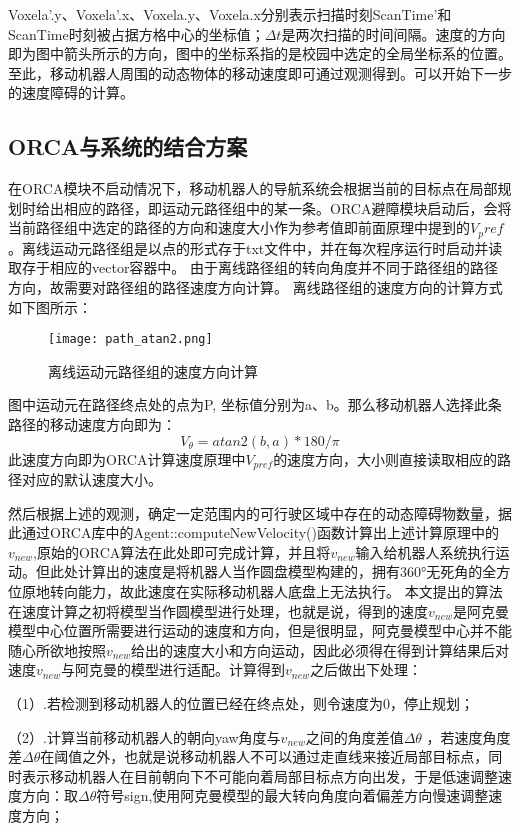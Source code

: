 Voxela'.y、Voxela'.x、Voxela.y、Voxela.x分别表示扫描时刻ScanTime'和ScanTime时刻被占据方格中心的坐标值；$\varDelta t$是两次扫描的时间间隔。速度的方向即为图中箭头所示的方向，图中的坐标系指的是校园中选定的全局坐标系的位置。
至此，移动机器人周围的动态物体的移动速度即可通过观测得到。可以开始下一步的速度障碍的计算。


\subsection{ORCA与系统的结合方案}
在ORCA模块不启动情况下，移动机器人的导航系统会根据当前的目标点在局部规划时给出相应的路径，即运动元路径组中的某一条。ORCA避障模块启动后，会将当前路径组中选定的路径的方向和速度大小作为参考值即前面原理中提到的$V_pref$。离线运动元路径组是以点的形式存于txt文件中，并在每次程序运行时启动并读取存于相应的vector容器中。
由于离线路径组的转向角度并不同于路径组的路径方向，故需要对路径组的路径速度方向计算。
离线路径组的速度方向的计算方式如下图所示：

\begin{figure}[ht]
    \centering
    \texttt{[image: path\_atan2.png]}
    \caption{离线运动元路径组的速度方向计算}
\end{figure}

图中运动元在路径终点处的点为P, 坐标值分别为a、b。那么移动机器人选择此条路径的移动速度方向即为：
\begin{equation}
    V_\theta = atan2(b ,a) * 180 / \pi 
\end{equation}
此速度方向即为ORCA计算速度原理中$V_{pref}$的速度方向，大小则直接读取相应的路径对应的默认速度大小。

然后根据上述的观测，确定一定范围内的可行驶区域中存在的动态障碍物数量，据此通过ORCA库中的Agent::computeNewVelocity()函数计算出上述计算原理中的$v_{new}$,原始的ORCA算法在此处即可完成计算，并且将$v_{new}$输入给机器人系统执行运动。但此处计算出的速度是将机器人当作圆盘模型构建的，拥有360°无死角的全方位原地转向能力，故此速度在实际移动机器人底盘上无法执行。
本文提出的算法在速度计算之初将模型当作圆模型进行处理，也就是说，得到的速度$v_{new}$是阿克曼模型中心位置所需要进行运动的速度和方向，但是很明显，阿克曼模型中心并不能随心所欲地按照$v_{new}$给出的速度大小和方向运动，因此必须得在得到计算结果后对速度$v_{new}$与阿克曼的模型进行适配。计算得到$v_{new}$之后做出下处理：

（1）.若检测到移动机器人的位置已经在终点处，则令速度为0，停止规划；

（2）.计算当前移动机器人的朝向yaw角度与$v_{new}$之间的角度差值$\varDelta\theta$ ，若速度角度差$\varDelta \theta$在阈值之外，也就是说移动机器人不可以通过走直线来接近局部目标点，同时表示移动机器人在目前朝向下不可能向着局部目标点方向出发，于是低速调整速度方向：取$\varDelta\theta$符号sign,使用阿克曼模型的最大转向角度向着偏差方向慢速调整速度方向；

